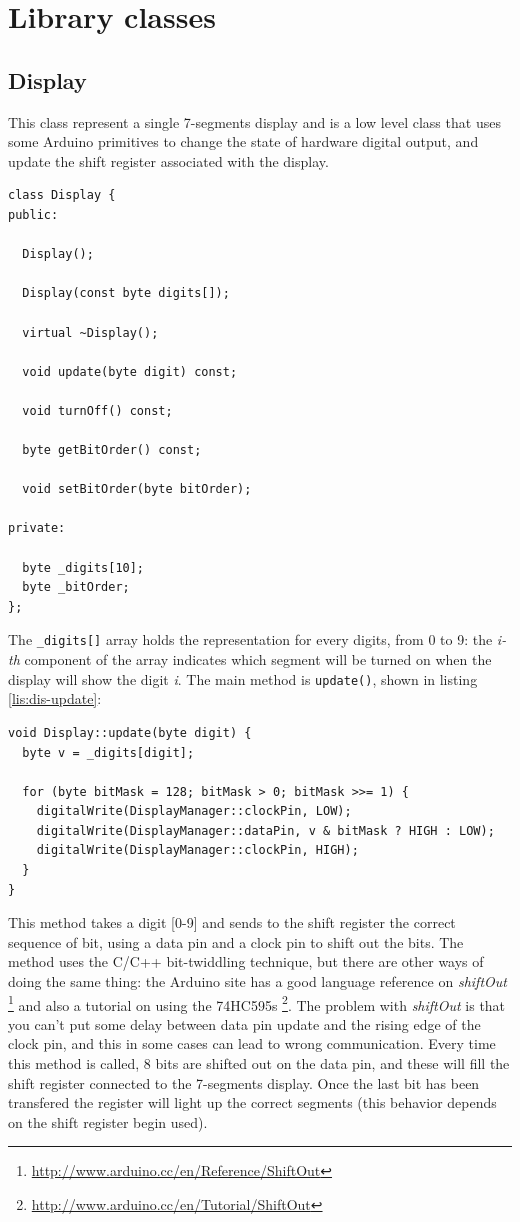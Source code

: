 \documentclass[11pt,english]{article}
\newcommand{\code}[1]{\texttt{#1}}
\begin{document}
\section{Library classes}\label{sec:lib-classes}


\subsection{Display}

This class represent a single 7-segments display and is a low level class that uses some Arduino 
primitives to change the state of hardware digital output, and update the shift register associated 
with the display.  
%
\begin{lstlisting}[label=lis:dis-class,caption=Display class]
class Display {
public:

  Display();

  Display(const byte digits[]);

  virtual ~Display();

  void update(byte digit) const;

  void turnOff() const;

  byte getBitOrder() const;

  void setBitOrder(byte bitOrder);

private:

  byte _digits[10]; 
  byte _bitOrder;   
};
\end{lstlisting}

The \code{\_digits[]} array holds the representation for every digits, from 0 to 9: the \emph{i-th} 
component of the array indicates which segment will be turned on when the display will show the digit 
\emph{i}.
The main method is \code{update()}, shown in listing \ref{lis:dis-update}:
%
\begin{lstlisting}[label=lis:dis-update,caption=Display update method]
void Display::update(byte digit) {
  byte v = _digits[digit];

  for (byte bitMask = 128; bitMask > 0; bitMask >>= 1) {
    digitalWrite(DisplayManager::clockPin, LOW);
    digitalWrite(DisplayManager::dataPin, v & bitMask ? HIGH : LOW);
    digitalWrite(DisplayManager::clockPin, HIGH);
  }
}
\end{lstlisting}

This method takes a digit [0-9] and sends to the shift register the correct sequence of bit, using 
a data pin and a clock pin to shift out the bits. The method uses the C/C++ bit-twiddling technique, but 
there are other ways of doing the same thing: the Arduino site has a good language reference on 
\emph{shiftOut} \footnote{\url{http://www.arduino.cc/en/Reference/ShiftOut}} and also a tutorial on 
using the 74HC595s \footnote{\url{http://www.arduino.cc/en/Tutorial/ShiftOut}}. The problem with 
\emph{shiftOut} is that you can't put some delay between data pin update and the rising edge of the 
clock pin, and this in some cases can lead to wrong communication.
Every time this method is called, 8 bits are shifted out on the data pin, and these will fill 
the shift register connected to the 7-segments display. Once the last bit has been transfered the 
register will light up the correct segments (this behavior depends on the shift register begin used).
\end{document}
